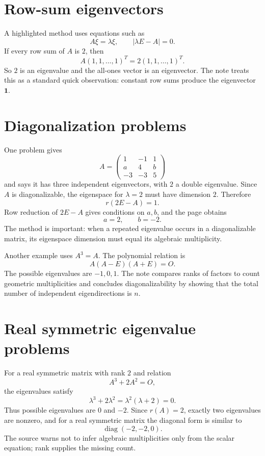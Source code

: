 \section{Row-sum eigenvectors}

A highlighted method uses equations such as
\[
  A\xi=\lambda\xi,\qquad |\lambda E-A|=0.
\]
If every row sum of $A$ is $2$, then
\[
  A(1,1,\ldots,1)^T=2(1,1,\ldots,1)^T.
\]
So $2$ is an eigenvalue and the all-ones vector is an eigenvector.  The note treats this as a standard quick observation: constant row sums produce the eigenvector $\mathbf 1$.

\section{Diagonalization problems}

One problem gives
\[
  A=\begin{pmatrix}1&-1&1\\a&4&b\\-3&-3&5\end{pmatrix}
\]
and says it has three independent eigenvectors, with $2$ a double eigenvalue.  Since $A$ is diagonalizable, the eigenspace for $\lambda=2$ must have dimension $2$.  Therefore
\[
  r(2E-A)=1.
\]
Row reduction of $2E-A$ gives conditions on $a,b$, and the page obtains
\[
  a=2,\qquad b=-2.
\]
The method is important: when a repeated eigenvalue occurs in a diagonalizable matrix, its eigenspace dimension must equal its algebraic multiplicity.

Another example uses $A^3=A$.  The polynomial relation is
\[
  A(A-E)(A+E)=O.
\]
The possible eigenvalues are $-1,0,1$.  The note compares ranks of factors to count geometric multiplicities and concludes diagonalizability by showing that the total number of independent eigendirections is $n$.

\section{Real symmetric eigenvalue problems}

For a real symmetric matrix with rank $2$ and relation
\[
  A^3+2A^2=O,
\]
the eigenvalues satisfy
\[
  \lambda^3+2\lambda^2=\lambda^2(\lambda+2)=0.
\]
Thus possible eigenvalues are $0$ and $-2$.  Since $r(A)=2$, exactly two eigenvalues are nonzero, and for a real symmetric matrix the diagonal form is similar to
\[
  \operatorname{diag}(-2,-2,0).
\]
The source warns not to infer algebraic multiplicities only from the scalar equation; rank supplies the missing count.


